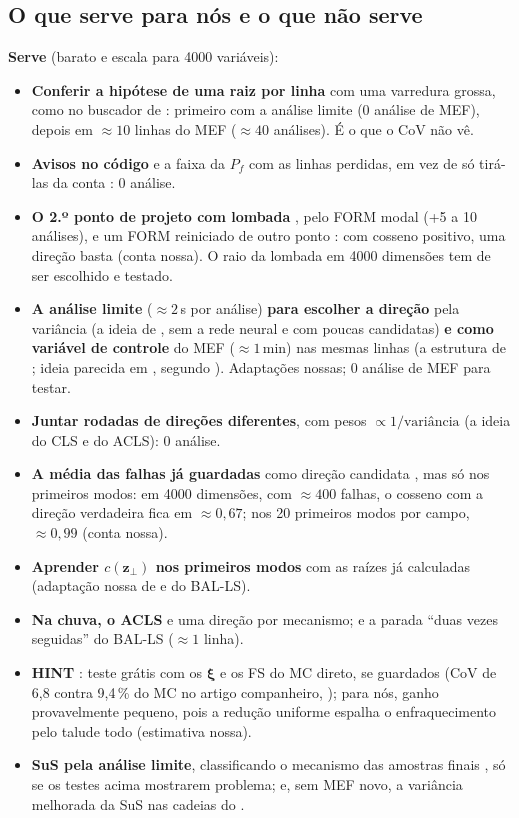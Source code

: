 \documentclass[11pt,a4paper]{article}
\begin{document}
\subsection{O que serve para nós e o que não serve}\label{sec:serve}
\textbf{Serve} (barato e escala para 4000 variáveis):
\begin{itemize}
  \item \textbf{Conferir a hipótese de uma raiz por linha} com uma varredura grossa, como no buscador de
    \citet{cheng2025}: primeiro com a análise limite (0 análise de MEF), depois em $\approx 10$ linhas do MEF
    ($\approx 40$ análises). É o que o CoV não vê.
  \item \textbf{Avisos no código} e a faixa da $P_f$ com as linhas perdidas, em vez de só tirá-las da conta
    \citep{cheng2025,song2021}: 0 análise.
  \item \textbf{O 2.º ponto de projeto com lombada} \citep{derkiureghian1998}, pelo FORM modal (+5 a 10 análises), e um
    FORM reiniciado de outro ponto \citep{valdebenito2010}: com cosseno positivo, uma direção basta (conta nossa). O
    raio da lombada em 4000 dimensões tem de ser escolhido e testado.
  \item \textbf{A análise limite} ($\approx 2$\,s por análise) \textbf{para escolher a direção} pela variância (a ideia de
    \citealp{zio2010}, sem a rede neural e com poucas candidatas) \textbf{e como variável de controle} do MEF
    ($\approx 1$\,min) nas mesmas linhas (a estrutura de \citealp{depina2016}; ideia parecida em
    \citealp{hohenbichler1988}, segundo \citealp{dang2024}). Adaptações nossas; 0 análise de MEF para testar.
  \item \textbf{Juntar rodadas de direções diferentes}, com pesos $\propto 1/\text{variância}$ (a ideia do CLS e do
    ACLS): 0 análise.
  \item \textbf{A média das falhas já guardadas} como direção candidata \citep{koutsourelakis2004}, mas só nos primeiros
    modos: em 4000 dimensões, com $\approx 400$ falhas, o cosseno com a direção verdadeira fica em $\approx 0{,}67$; nos
    20 primeiros modos por campo, $\approx 0{,}99$ (conta nossa).
  \item \textbf{Aprender $c(\bm z_\perp)$ nos primeiros modos} com as raízes já calculadas (adaptação nossa de
    \citealp{ehre2022} e do BAL-LS).
  \item \textbf{Na chuva, o ACLS} \citep{yuan2024} e uma direção por mecanismo; e a parada ``duas vezes seguidas'' do
    BAL-LS ($\approx 1$ linha).
  \item \textbf{HINT} \citep{depina2025}: teste grátis com os $\bm\xi$ e os FS do MC direto, se guardados (CoV de 6,8
    contra 9,4\,\% do MC no artigo companheiro, \citealp{depina2025isgsr}); para nós, ganho provavelmente pequeno, pois a
    redução uniforme espalha o enfraquecimento pelo talude todo (estimativa nossa).
  \item \textbf{SuS pela análise limite}, classificando o mecanismo das amostras finais \citep{vandeneijnden2017}, só se
    os testes acima mostrarem problema; e, sem MEF novo, a variância melhorada da SuS \citep{susvar2025} nas cadeias do
    .
\end{itemize}
\end{document}
